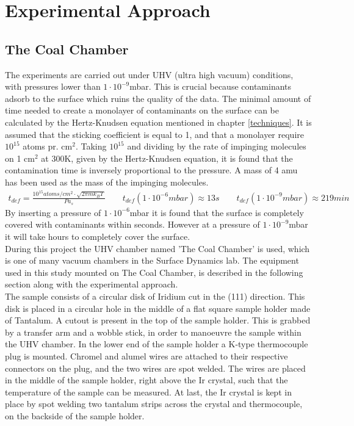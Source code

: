 \chapter{Experimental Approach}
\label{cha:procedure}

\section{The Coal Chamber}

  The experiments are carried out under UHV (ultra high vacuum) conditions, with pressures lower than $1\cdot 10^{-9}$mbar. This is crucial because contaminants adsorb to the surface which ruins the quality of the data. The minimal amount of time needed to create a monolayer of contaminants on the surface can be calculated by the Hertz-Knudsen equation mentioned in chapter \ref{techniques}. It is assumed that the sticking coefficient is equal to 1, and that a monolayer require $10^{15}$ atoms pr. cm$^2$.\cite{MLkilde} Taking $10^{15}$ and dividing by the rate of impinging molecules on 1 cm$^2$ at 300K, given by the Hertz-Knudsen equation, it is found that the contamination time is inversely proportional to the pressure. A mass of 4 amu has been used as the mass of the impinging molecules.\\
  \begin{align}
    t_{def} = \frac{10^{15}atoms/cm^2 \cdot \sqrt{2\pi m k_B T}}{P a_s} \qquad t_{def}(1\cdot10^{-6}mbar) \approx 13s \qquad t_{def}(1\cdot10^{-9}mbar) \approx 219min
  \end{align}
  By inserting a pressure of $1\cdot 10^{-6}$mbar it is found that the surface is completely covered with contaminants within seconds. However at a pressure of $1\cdot 10^{-9}$mbar it will take hours to completely cover the surface.\\
  During this project the UHV chamber named 'The Coal Chamber' is used, which is one of many vacuum chambers in the Surface Dynamics lab. The equipment used in this study mounted on The Coal Chamber, is described in the following section along with the experimental approach. \\
  The sample consists of a circular disk of Iridium cut in the (111) direction. This disk is placed in a circular hole in the middle of a flat square sample holder made of Tantalum.  A cutout is present in the top of the sample holder. This is grabbed by a transfer arm and a wobble stick, in order to manoeuvre the sample within the UHV chamber. In the lower end of the sample holder a K-type thermocouple plug is mounted. Chromel and alumel wires are attached to their respective connectors on the plug, and the two wires are spot welded. The wires are placed in the middle of the sample holder, right above the Ir crystal, such that the temperature of the sample can be measured. At last, the Ir crystal is kept in place by spot welding two tantalum strips across the crystal and thermocouple, on the backside of the sample holder.\\
